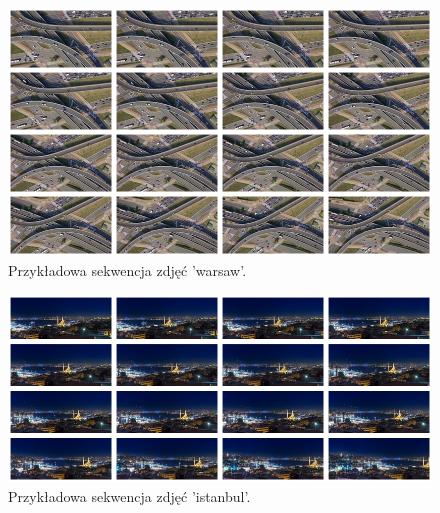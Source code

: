 \begin{figure}[H]
	\centering
		\includegraphics[width=0.75\linewidth]{img/warsaw_cuted_frames_tile.png}
	\caption[Sekwencja zdjęć 'warsaw'.]{Przykładowa sekwencja zdjęć 'warsaw'.}
	\label{fig:binary}
\end{figure}

\begin{figure}[H]
	\centering
		\includegraphics[width=0.75\linewidth]{img/istanbul_cuted_frames_tile.png}
	\caption[Sekwencja zdjęć 'istanbul'.]{Przykładowa sekwencja zdjęć 'istanbul'.}
	\label{fig:binary}
\end{figure}